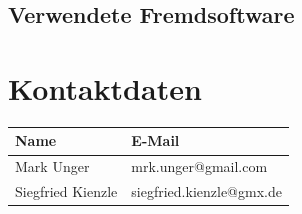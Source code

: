 \documentclass[12pt]{scrartcl}
\begin{document}
\subsection{Verwendete Fremdsoftware}
\label{sec:technical-background-fremdsoftware}
\newpage
\section{Kontaktdaten}
\label{sec:kontaktdaten}
\begin{table}[H]
\label{kontaktdaten}
\begin{tabular}{|l|l|}
\hline
\rowcolor[HTML]{9B9B9B} 
Name              & E-Mail                   \\ \hline
Mark Unger        & mrk.unger@gmail.com      \\ \hline
Siegfried Kienzle & siegfried.kienzle@gmx.de \\ \hline
\end{tabular}
\end{table}
\end{document}

